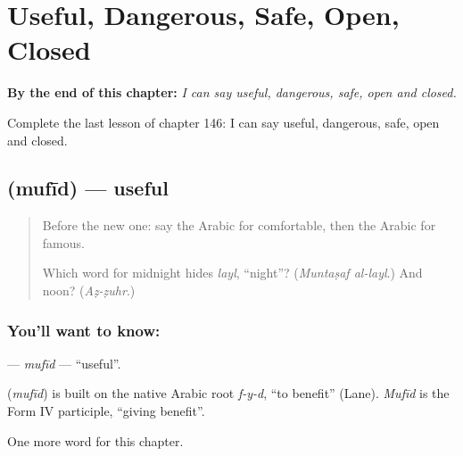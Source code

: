 
\chapter{Useful, Dangerous, Safe, Open, Closed}
\label{ch:ar-useful-dangerous-safe-open-closed}

\begin{chapteropening}
\textbf{By the end of this chapter:} \emph{I can say useful, dangerous, safe, open and closed.}

Complete the last lesson of chapter 146: I can say useful, dangerous, safe, open and closed.
\end{chapteropening}

\section[\texorpdfstring{\ar{مفيد} (mufīd)}{مفيد (mufīd)}]{ (mufīd) — useful}

\label{lesson:AR-C146-mufid}



\begin{quote}
Before the new one: say the Arabic for comfortable, then the Arabic for famous.

Which word for midnight hides \emph{layl}, \textquotedblleft{}night\textquotedblright{}? (\emph{Muntaṣaf al-layl}.) And noon? (\emph{Aẓ-ẓuhr}.)
\end{quote}

\subsection*{You'll want to know: }
\textbf{} — \emph{mufīd} — \textquotedblleft{}useful\textquotedblright{}.

\begin{cousinweb}
\textbf{} (\emph{mufīd}) is built on the native Arabic root \emph{f-y-d}, \textquotedblleft{}to benefit\textquotedblright{} (Lane). \emph{Mufīd} is the Form IV participle, \textquotedblleft{}giving benefit\textquotedblright{}.
\end{cousinweb}

\begin{grammarlens}[title={What you've built}]
One more word for this chapter.
\end{grammarlens}

